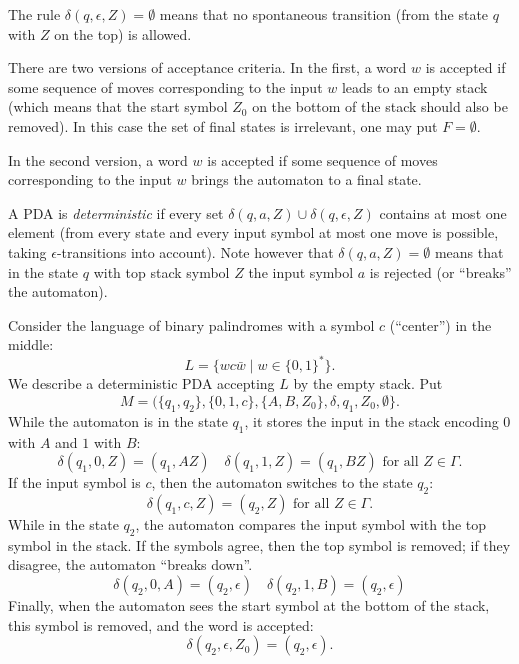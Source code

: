 \begin{page}

\begin{exl}
The rule $\delta(q, \epsilon, Z) = \emptyset$ means that no spontaneous transition (from the state $q$ with $Z$ on the top) is allowed.
\end{exl}

\end{page}

\begin{page}


There are two versions of acceptance criteria.
In the first, a word $w$ is accepted if some sequence of moves corresponding to the input $w$ leads to an empty stack
(which means that the start symbol $Z_0$ on the bottom of the stack should also be removed).
In this case the set of final states is irrelevant, one may put $F = \emptyset$.

In the second version, a word $w$ is accepted if some sequence of moves corresponding to the input $w$ brings the automaton to a final state.

A PDA is \emph{deterministic} if every set $\delta(q, a, Z) \cup \delta(q, \epsilon, Z)$ contains at most one element
(from every state and every input symbol at most one move is possible, taking $\epsilon$-transitions into account).
Note however that $\delta(q, a, Z) = \emptyset$ means that in the state $q$ with top stack symbol $Z$
the input symbol $a$ is rejected (or ``breaks'' the automaton).


\end{page}

\begin{page}

\begin{exl}
Consider the language of binary palindromes with a symbol $c$ (``center'') in the middle:
\[
L = \{w c \bar{w} \mid w \in \{0,1\}^*\}.
\]
We describe a deterministic PDA accepting $L$ by the empty stack. Put
\[
M = (\{q_1, q_2\}, \{0, 1, c\}, \{A, B, Z_0\}, \delta, q_1, Z_0, \emptyset\}.
\]
While the automaton is in the state $q_1$, it stores the input in the stack encoding $0$ with $A$ and $1$ with $B$:
\[
\delta(q_1, 0, Z) = (q_1, AZ) \quad \delta(q_1, 1, Z) = (q_1, BZ) \text{ for all }Z \in \Gamma.
\]
If the input symbol is $c$, then the automaton switches to the state $q_2$:
\[
\delta(q_1, c, Z) = (q_2, Z) \text{ for all }Z \in \Gamma.
\]
While in the state $q_2$, the automaton compares the input symbol with the top symbol in the stack.
If the symbols agree, then the top symbol is removed; if they disagree, the automaton ``breaks down''.
\[
\delta(q_2, 0, A) = (q_2, \epsilon) \quad \delta(q_2, 1, B) = (q_2, \epsilon)
\]
Finally, when the automaton sees the start symbol at the bottom of the stack, this symbol is removed, and the word is accepted:
\[
\delta(q_2, \epsilon, Z_0) = (q_2, \epsilon).
\]
\end{exl}

\end{page}

